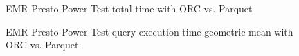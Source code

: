 \begin{figure}
   \begin{center}
   \end{center}
   \caption{EMR Presto Power Test total time with ORC vs. Parquet}
   \label{fig:additionalResultsPrestoORCvsParquetPowerTestTotalTime}
\end{figure}

\begin{figure}
   \begin{center}
   \end{center}
   \caption{EMR Presto Power Test query execution time geometric mean with ORC vs. Parquet.}
   \label{fig:additionalResultsPrestoORCvsParquetPowerTestGeomean}
\end{figure}

